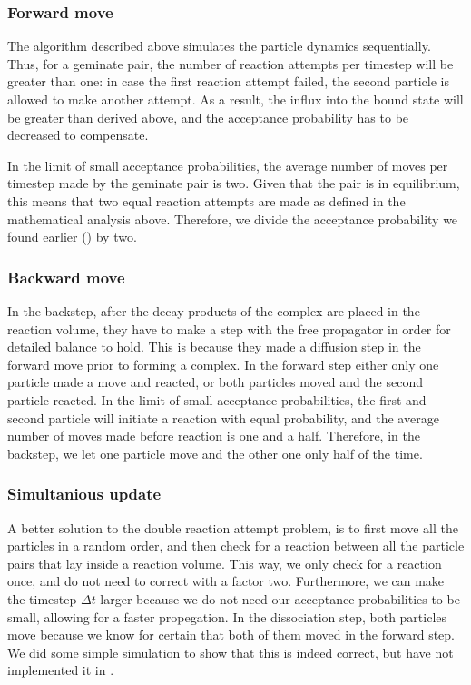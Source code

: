 \subsubsection{Forward move}
The algorithm described above simulates the particle dynamics sequentially. Thus, for a geminate pair, the number of reaction attempts per timestep will be greater than one: in case the first reaction attempt failed, the second particle is allowed to make another attempt. As a result, the influx into the bound state will be greater than derived above, and the acceptance probability has to be decreased to compensate.

In the limit of small acceptance probabilities, the average number of moves per timestep made by the geminate pair is two. Given that the pair is in equilibrium, this means that two equal reaction attempts are made as defined in the mathematical analysis above. Therefore, we divide the acceptance probability we found earlier () by two.

\subsubsection{Backward move}
In the backstep, after the decay products of the complex are placed in the reaction volume, they have to make a step with the free propagator in order for detailed balance to hold. This is because they made a diffusion step in the forward move prior to forming a complex. In the forward step either only one particle made a move and reacted, or both particles moved and the second particle reacted. In the limit of small acceptance probabilities, the first and second particle will initiate a reaction with equal probability, and the average number of moves made before reaction is one and a half. Therefore, in the backstep, we let one particle move and the other one only half of the time.

\subsubsection{Simultanious update}
A better solution to the double reaction attempt problem, is to first move all the particles in a random order, and then check for a reaction between all the particle pairs that lay inside a reaction volume. This way, we only check for a reaction once, and do not need to correct with a factor two. Furthermore, we can make the timestep $\Delta t$ larger because we do not need our acceptance probabilities to be small, allowing for a faster propegation. In the dissociation step, both particles move because we know for certain that both of them moved in the forward step. We did some simple simulation to show that this is indeed correct, but have not implemented it in \GFRD.


